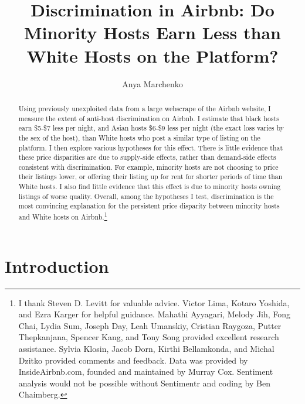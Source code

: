 \documentclass[11pt, oneside]{article}
\begin{document}



\title{Discrimination in Airbnb: Do Minority Hosts Earn Less than White Hosts on the Platform?}
\author{Anya Marchenko}
\maketitle

\begin{abstract}

Using previously unexploited data from a large webscrape of the Airbnb website, I measure the extent of anti-host discrimination on Airbnb. I estimate that black hosts earn \$5-\$7 less per night, and Asian hosts \$6-\$9 less per night (the exact loss varies by the sex of the host), than White hosts who post a similar type of listing on the platform. I then explore various hypotheses for this effect. There is little evidence that these price disparities are due to supply-side effects, rather than demand-side effects consistent with discrimination.  For example, minority hosts are not choosing to price their listings lower, or offering their listing up for rent for shorter periods of time than White hosts. I also find little evidence that this effect is due to minority hosts owning listings of worse quality. Overall, among the hypotheses I test, discrimination is the most convincing explanation for the persistent price disparity between minority hosts and White hosts on Airbnb.\footnote{I thank Steven D. Levitt for valuable advice. Victor Lima, Kotaro Yoshida, and Ezra Karger for helpful guidance. Mahathi Ayyagari, Melody Jih, Fong Chai, Lydia Sum, Joseph Day, Leah Umanskiy, Cristian Raygoza, Putter Thepkanjana, Spencer Kang, and Tony Song provided excellent research assistance. Sylvia Klosin, Jacob Dorn, Kirthi Bellamkonda, and Michal Dzitko provided comments and feedback. Data was provided by InsideAirbnb.com, founded and maintained by Murray Cox. Sentiment analysis would not be possible without Sentimentr and coding by Ben Chaimberg.} \end{abstract}

\doublespacing
\section{Introduction} %
\end{document}
